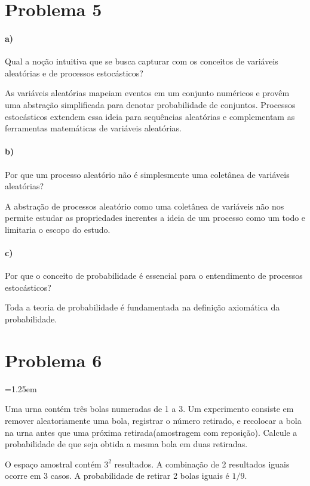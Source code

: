 \documentclass{article}
\newenvironment{nscenter}
 {\parskip=1.25em\par\nopagebreak\centering}
 {\par\noindent\ignorespacesafterend}
\begin{document}
\section*{Problema 5}
\paragraph{a)} Qual a noção intuitiva que se busca capturar com os conceitos de variáveis
aleatórias e de processos estocásticos?

As variáveis aleatórias mapeiam eventos em um conjunto numéricos e provêm uma abstração
simplificada para denotar probabilidade de conjuntos. Processos estocásticos extendem essa ideia
para sequências aleatórias e complementam as ferramentas matemáticas de variáveis aleatórias.

\paragraph{b)} Por que um processo aleatório não é simplesmente uma coletânea de variáveis
aleatórias?

A abstração de processos aleatório como uma coletânea de variáveis não nos permite estudar as
propriedades inerentes a ideia de um processo como um todo e limitaria o escopo do estudo.

\paragraph{c)} Por que o conceito de probabilidade é essencial para o entendimento de processos
estocásticos?

Toda a teoria de probabilidade é fundamentada na definição axiomática da probabilidade.

\section*{Problema 6}
\begin{nscenter}
Uma urna contém três bolas numeradas de 1 a 3. Um experimento consiste em remover aleatoriamente
uma bola, registrar o número retirado, e recolocar a bola na urna antes que uma próxima
retirada(amostragem com reposição). Calcule a probabilidade de que seja obtida a mesma bola em
duas retiradas.
\end{nscenter}
O espaço amostral contém $3^2$ resultados. A combinação de 2 resultados iguais ocorre em $3$
casos. A probabilidade de retirar 2 bolas iguais é $1/9$.
\end{document}
